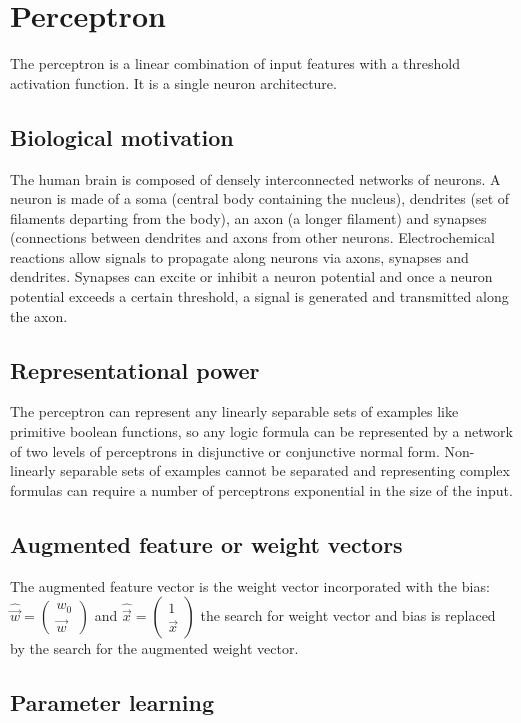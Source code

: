 \section{Perceptron}
The perceptron is a linear combination of input features with a threshold activation function.
It is a single neuron architecture.

	\subsection{Biological motivation}
	The human brain is composed of densely interconnected networks of neurons.
	A neuron is made of a soma (central body containing the nucleus), dendrites (set of filaments departing from the body), an axon (a longer filament) and synapses (connections between dendrites and axons from other neurons.
	Electrochemical reactions allow signals to propagate along neurons via axons, synapses and dendrites.
	Synapses can excite or inhibit a neuron potential and once a neuron potential exceeds a certain threshold, a signal is generated and transmitted along the axon.

	\subsection{Representational power}
	The perceptron can represent any linearly separable sets of examples like primitive boolean functions, so any logic formula can be represented by a network of two levels of perceptrons in disjunctive or conjunctive normal form.
	Non-linearly separable sets of examples cannot be separated and representing complex formulas can require a number of perceptrons exponential in the size of the input.

	\subsection{Augmented feature or weight vectors}
	The augmented feature vector is the weight vector incorporated with the bias: $\hat{\vec{w}} = \begin{pmatrix}w_0\\\vec{w}\end{pmatrix}$ and $\hat{\vec{x}} = \begin{pmatrix}1\\\vec{x}\end{pmatrix}$ the search for weight vector and bias is replaced by the search for the augmented weight vector.

	\subsection{Parameter learning}

